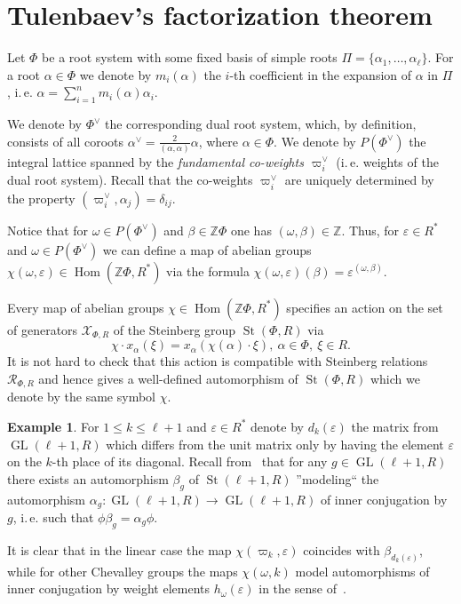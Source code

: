 \documentclass[oneside, 10pt]{amsart}
\DeclareMathOperator{\St}{St}
\DeclareMathOperator{\Hom}{Hom}
\DeclareMathOperator{\GL}{GL}
\newcommand{\ZZ}{\mathbb{Z}}
\newcommand{\XX}{\mathcal{X}}           %
\newcommand{\RR}[1]{\mathcal{R}_{#1}}   %
\numberwithin{equation}{section}
\numberwithin{lemma}{section}
\theoremstyle{definition}
\newtheorem{example}[lemma]{Example}
\theoremstyle{remark}
\begin{document}
\section{Tulenbaev's factorization theorem}
Let $\Phi$ be a root system with some fixed basis of simple roots $\Pi = \{\alpha_1, \ldots, \alpha_\ell\}$.
For a root $\alpha\in\Phi$ we denote by $m_i(\alpha)$ the $i$-th coefficient in the expansion of $\alpha$ in $\Pi$,
 i.\,e. $\alpha = \sum_{i=1}^n m_i(\alpha) \alpha_i$.

We denote by $\Phi^\vee$ the corresponding dual root system, which, by definition, consists of all coroots 
 $\alpha^\vee = \frac{2}{(\alpha, \alpha)} \alpha$, where $\alpha \in \Phi$.
We denote by $P(\Phi^\vee)$ the integral lattice spanned by the \emph{fundamental co-weights $\varpi^\vee_i$} (i.\,e. weights of the dual root system).
Recall that the co-weights $\varpi^\vee_i$ are uniquely determined by the property $(\varpi_i^\vee, \alpha_j) = \delta_{ij}$.

Notice that for $\omega \in P(\Phi^\vee)$ and $\beta \in \ZZ \Phi$ one has $(\omega, \beta) \in \ZZ $.
Thus, for $\varepsilon \in R^*$ and $\omega \in P(\Phi^\vee)$ we can define a map of abelian groups $\chi(\omega, \varepsilon) \in \Hom(\ZZ \Phi, R^*)$
 via the formula $\chi(\omega, \varepsilon)(\beta) = \varepsilon ^ {(\omega, \beta)}$.

Every map of abelian groups $\chi \in \Hom(\ZZ \Phi, R^*)$ specifies an action on the set of generators $\XX_{\Phi, R}$ of the Steinberg group $\St(\Phi, R)$ via
\begin{equation} \chi \cdot x_\alpha(\xi) = x_\alpha(\chi(\alpha) \cdot \xi),\ \alpha\in \Phi,\ \xi \in R. \end{equation}
It is not hard to check that this action is compatible with Steinberg relations $\RR{\Phi, R}$ and 
 hence gives a well-defined automorphism of $\St(\Phi, R)$ which we denote by the same symbol $\chi$.
 
\begin{example}
For $1\leq k\leq \ell+1$ and $\varepsilon \in R^*$ denote by $d_k(\varepsilon)$ the matrix from $\GL(\ell+1, R)$ which differs from the unit matrix 
 only by having the element $\varepsilon$ on the $k$-th place of its diagonal.
Recall from~\cite[Corollary~4]{Ka77} that for any $g \in \GL(\ell+1, R)$ there exists an automorphism $\beta_g$ of $\St(\ell+1, R)$ 
 ''modeling`` the automorphism $\alpha_g \colon \GL(\ell+1, R) \to \GL(\ell+1, R)$ of inner conjugation by $g$, i.\,e. such that $\phi \beta_g = \alpha_g \phi$.

It is clear that in the linear case the map $\chi(\varpi_k, \varepsilon)$ coincides with $\beta_{d_k(\varepsilon)}$, 
 while for other Chevalley groups the maps $\chi(\omega, k)$ model automorphisms of inner conjugation by weight elements $h_\omega(\varepsilon)$
  in the sense of~\cite[\S~4]{Vav09}.
\end{example}
\end{document}
